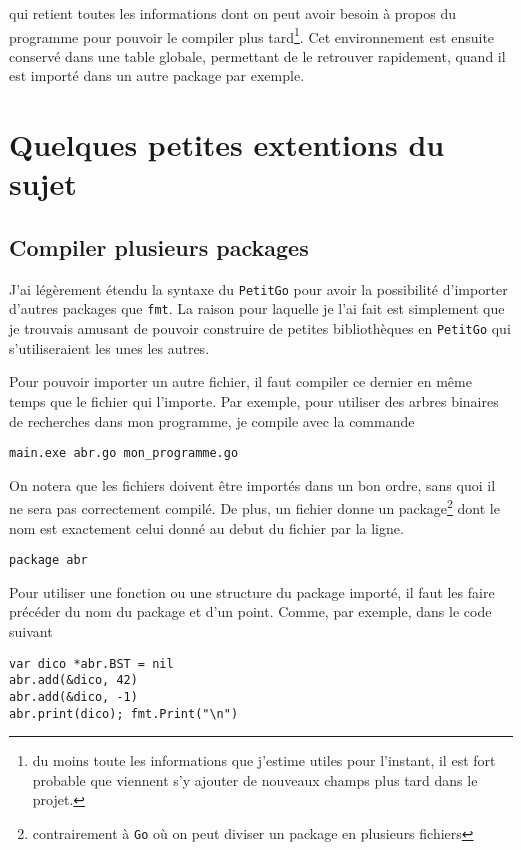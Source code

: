 \documentclass{article}
\begin{document}
qui retient toutes les informations dont on peut avoir besoin à propos du programme pour pouvoir le compiler plus tard\footnote{du moins toute les informations que j'estime utiles pour l'instant, il est fort probable que viennent s'y ajouter de nouveaux champs plus tard dans le projet.}. Cet environnement est ensuite conservé dans une table globale, permettant de le retrouver rapidement, quand il est importé dans un autre package par exemple.

\section{Quelques petites extentions du sujet}

\subsection{Compiler plusieurs packages\label{sec:pkg}}

J'ai légèrement étendu la syntaxe du \texttt{PetitGo} pour avoir la possibilité d'importer d'autres packages que \texttt{fmt}. La raison pour laquelle je l'ai fait est simplement que je trouvais amusant de pouvoir construire de petites bibliothèques en \texttt{PetitGo} qui s'utiliseraient les unes les autres.

Pour pouvoir importer un autre fichier, il faut compiler ce dernier en même temps que le fichier qui l'importe. Par exemple, pour utiliser des arbres binaires de recherches dans mon programme, je compile avec la commande

\begin{verbatim}
main.exe abr.go mon_programme.go
\end{verbatim}

On notera que les fichiers doivent être importés dans un bon ordre, sans quoi il ne sera pas correctement compilé. De plus, un fichier donne un package\footnote{contrairement à \texttt{Go} où on peut diviser un package en plusieurs fichiers} dont le nom est exactement celui donné au debut du fichier par la ligne.

\begin{verbatim}
package abr
\end{verbatim}

Pour utiliser une fonction ou une structure du package importé, il faut les faire précéder du nom du package et d'un point. Comme, par exemple, dans le code suivant

\begin{verbatim}
var dico *abr.BST = nil
abr.add(&dico, 42)
abr.add(&dico, -1)
abr.print(dico); fmt.Print("\n")
\end{verbatim}
\end{document}
